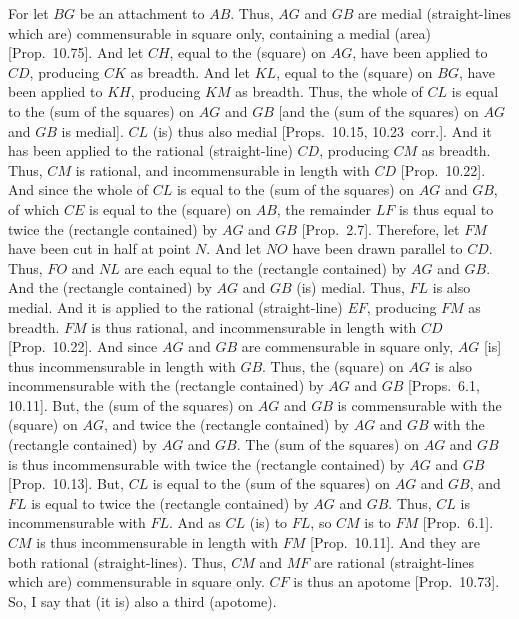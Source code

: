 \begin{Parallel}{}{}
{For let $BG$ be an attachment to $AB$. Thus, $AG$ and $GB$ are medial
(straight-lines which are) commensurable in square only, containing
a medial (area) [Prop.~10.75]. And let $CH$,
equal to the (square) on $AG$, have been applied to $CD$, producing
$CK$ as breadth. And let $KL$, equal to the (square) on $BG$, have
been applied to $KH$, producing $KM$ as breadth. Thus, the whole
of $CL$ is equal to the (sum of the squares) on $AG$ and $GB$ [and
the (sum of the squares) on $AG$ and $GB$ is medial]. $CL$ (is) thus
also medial [Props.~10.15, 10.23~corr.]. And it has been applied to the rational (straight-line)
$CD$, producing $CM$ as breadth. Thus, $CM$ is rational, and
incommensurable in length with $CD$ [Prop.~10.22]. And since the whole of $CL$ is equal
to the (sum of the squares) on $AG$ and $GB$, of which $CE$ is
equal to the (square) on $AB$, the remainder $LF$ is thus equal to
twice the (rectangle contained) by $AG$ and $GB$ [Prop.~2.7]. Therefore, let $FM$ have been
cut in half at point $N$. And let $NO$ have been drawn parallel to $CD$.
Thus, $FO$ and $NL$ are each equal to the (rectangle contained) by
$AG$ and $GB$. And the (rectangle contained) by $AG$ and $GB$ (is)
medial. Thus, $FL$ is also medial. And it is applied to the
rational (straight-line) $EF$, producing $FM$ as breadth.
$FM$ is thus rational, and incommensurable in length with $CD$ [Prop.~10.22]. And since $AG$ and $GB$
are commensurable in square only, $AG$ [is] thus incommensurable
in length with $GB$. Thus, the (square) on $AG$ is also incommensurable
with the (rectangle contained) by $AG$ and $GB$
[Props.~6.1, 10.11]. But,  the (sum of the squares) on $AG$
and $GB$ is commensurable with the (square) on $AG$, and twice the
(rectangle contained) by $AG$ and $GB$ with the (rectangle contained)
by $AG$ and $GB$. The (sum of the squares) on $AG$ and $GB$
is thus incommensurable with twice the (rectangle contained)
by $AG$ and $GB$ [Prop.~10.13]. But,
$CL$ is equal to the (sum of the squares) on $AG$ and $GB$, 
and $FL$ is equal to twice the (rectangle contained) by $AG$ and $GB$. Thus,
$CL$ is incommensurable with $FL$. And as $CL$ (is) to $FL$, so
$CM$ is to $FM$ [Prop.~6.1].  $CM$ is thus
incommensurable in length with $FM$ [Prop.~10.11]. And they are both rational (straight-lines). Thus, $CM$ and $MF$ are rational (straight-lines which are)
commensurable in square only. $CF$ is thus an apotome [Prop.~10.73]. So, I say that (it is) also a
third (apotome).

}
\end{Parallel}
